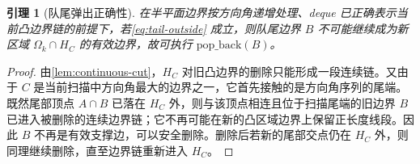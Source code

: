 \documentclass[UTF8,12pt,a4paper]{ctexart}
\newtheorem{lemma}[theorem]{引理}
\theoremstyle{definition}
\begin{document}
\begin{lemma}[队尾弹出正确性]
在半平面边界按方向角递增处理、deque 已正确表示当前凸边界链的前提下，若\cref{eq:tail-outside} 成立，则队尾边界 $B$ 不可能继续成为新区域 $\Omega_k\cap H_C$ 的有效边界，故可执行 $\mathrm{pop\_back}(B)$。
\label{lem:pop-back}
\end{lemma}
\begin{proof}
由\cref{lem:continuous-cut}，$H_C$ 对旧凸边界的删除只能形成一段连续链。又由于 $C$ 是当前扫描中方向角最大的边界之一，它首先接触的是方向角序列的尾端。既然尾部顶点 $A\cap B$ 已落在 $H_C$ 外，则与该顶点相连且位于扫描尾端的旧边界 $B$ 已进入被删除的连续边界链；它不再可能在新的凸区域边界上保留正长度线段。因此 $B$ 不再是有效支撑边，可以安全删除。删除后若新的尾部交点仍在 $H_C$ 外，则同理继续删除，直至边界链重新进入 $H_C$。
\end{proof}
\end{document}
